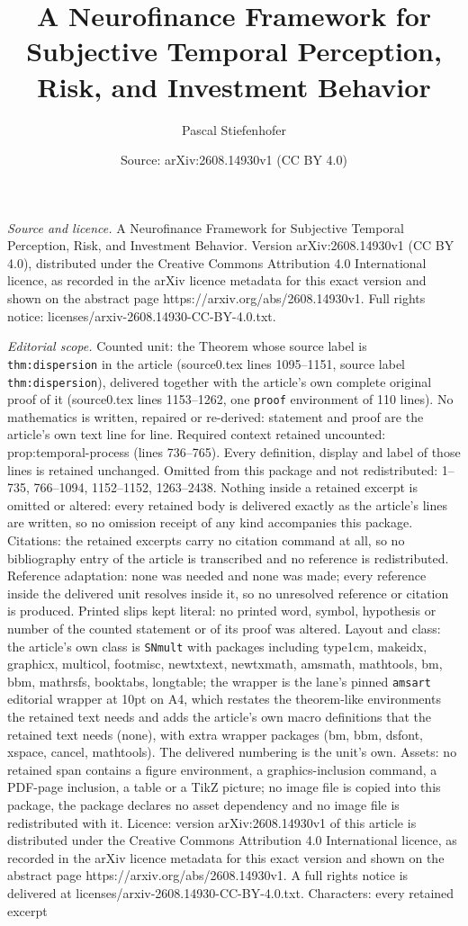 \documentclass[10pt,a4paper]{amsart}
\title[A Neurofinance Framework for Subjective Temporal Perception,]{A Neurofinance Framework for Subjective Temporal Perception, Risk, and Investment Behavior}
\author{Pascal Stiefenhofer}
\date{Source: arXiv:2608.14930v1 (CC BY 4.0)}
\begin{document}
\maketitle

\noindent\emph{Source and licence.} A Neurofinance Framework for Subjective Temporal Perception, Risk, and Investment Behavior. Version arXiv:2608.14930v1 (CC BY 4.0), distributed under the Creative Commons Attribution 4.0 International licence, as recorded in the arXiv licence metadata for this exact version and shown on the abstract page https://arxiv.org/abs/2608.14930v1. Full rights notice: licenses/arxiv-2608.14930-CC-BY-4.0.txt.\par\smallskip

\noindent\textit{Editorial scope.} Counted unit: the Theorem whose source label is \texttt{thm:dispersion} in the article (source0.tex lines 1095--1151, source label \texttt{thm:dispersion}), delivered together with the article's own complete original proof of it (source0.tex lines 1153--1262, one \texttt{proof} environment of 110 lines). No mathematics is written, repaired or re-derived: statement and proof are the article's own text line for line. Required context retained uncounted: prop:temporal-process (lines 736--765). Every definition, display and label of those lines is retained unchanged. Omitted from this package and not redistributed: 1--735, 766--1094, 1152--1152, 1263--2438. Nothing inside a retained excerpt is omitted or altered: every retained body is delivered exactly as the article's lines are written, so no omission receipt of any kind accompanies this package. Citations: the retained excerpts carry no citation command at all, so no bibliography entry of the article is transcribed and no reference is redistributed. Reference adaptation: none was needed and none was made; every reference inside the delivered unit resolves inside it, so no unresolved reference or citation is produced. Printed slips kept literal: no printed word, symbol, hypothesis or number of the counted statement or of its proof was altered. Layout and class: the article's own class is \texttt{SNmult} with packages including type1cm, makeidx, graphicx, multicol, footmisc, newtxtext, newtxmath, amsmath, mathtools, bm, bbm, mathrsfs, booktabs, longtable; the wrapper is the lane's pinned \texttt{amsart} editorial wrapper at 10pt on A4, which restates the theorem-like environments the retained text needs and adds the article's own macro definitions that the retained text needs (none), with extra wrapper packages (bm, bbm, dsfont, xspace, cancel, mathtools). The delivered numbering is the unit's own. Assets: no retained span contains a figure environment, a graphics-inclusion command, a PDF-page inclusion, a table or a TikZ picture; no image file is copied into this package, the package declares no asset dependency and no image file is redistributed with it. Licence: version arXiv:2608.14930v1 of this article is distributed under the Creative Commons Attribution 4.0 International licence, as recorded in the arXiv licence metadata for this exact version and shown on the abstract page https://arxiv.org/abs/2608.14930v1. A full rights notice is delivered at licenses/arxiv-2608.14930-CC-BY-4.0.txt. Characters: every retained excerpt 
\end{document}
